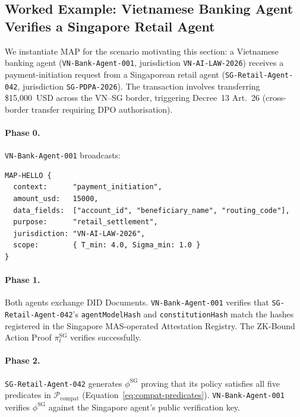 \subsection{Worked Example: Vietnamese Banking Agent Verifies
            a Singapore Retail Agent}
\label{sec:map-worked-example}

We instantiate MAP for the scenario motivating this section: a Vietnamese
banking agent (\texttt{VN-Bank-Agent-001}, jurisdiction
\texttt{VN-AI-LAW-2026}) receives a payment-initiation request from a
Singaporean retail agent (\texttt{SG-Retail-Agent-042}, jurisdiction
\texttt{SG-PDPA-2026}).  The transaction involves transferring
\$15,000~USD across the VN--SG border, triggering Decree~13 Art.~26
(cross-border transfer requiring DPO authorisation).

\paragraph{Phase 0.}
\texttt{VN-Bank-Agent-001} broadcasts:
\begin{verbatim}
MAP-HELLO {
  context:      "payment_initiation",
  amount_usd:   15000,
  data_fields:  ["account_id", "beneficiary_name", "routing_code"],
  purpose:      "retail_settlement",
  jurisdiction: "VN-AI-LAW-2026",
  scope:        { T_min: 4.0, Sigma_min: 1.0 }
}
\end{verbatim}

\paragraph{Phase 1.}
Both agents exchange DID Documents.
\texttt{VN-Bank-Agent-001} verifies that
\texttt{SG-Retail-Agent-042}'s \texttt{agentModelHash} and
\texttt{constitutionHash} match the hashes registered in the Singapore
MAS-operated Attestation Registry.  The ZK-Bound Action Proof
$\pi^{\text{SG}}_t$ verifies successfully.

\paragraph{Phase 2.}
\texttt{SG-Retail-Agent-042} generates $\phi^{\text{SG}}$ proving that its
policy satisfies all five predicates in
$\mathcal{P}_{\text{compat}}$ (Equation~\ref{eq:compat-predicates}).
\texttt{VN-Bank-Agent-001} verifies $\phi^{\text{SG}}$ against the
Singapore agent's public verification key.

